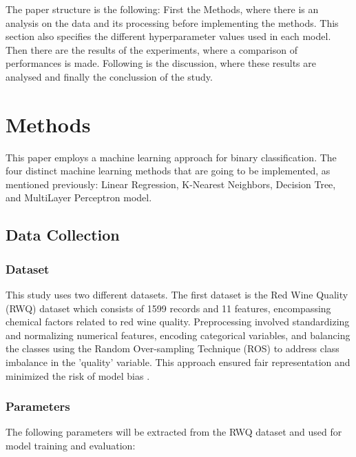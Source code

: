 \documentclass[conference]{IEEEtran}
\begin{document}
The paper structure is the following: First the Methods, where there is an analysis on the data and its processing before implementing the methods. This section also specifies the different hyperparameter values used in each model. Then there are the results of the experiments, where a comparison of performances is made. Following is the discussion, where these results are analysed and finally the conclussion of the study.

\section{Methods}
This paper employs a machine learning approach for binary classification. The four distinct machine learning methods that are going to be implemented, as mentioned previously: Linear Regression, K-Nearest Neighbors, Decision Tree, and MultiLayer Perceptron model.

\subsection{Data Collection}
\subsubsection{Dataset} 
This study uses two different datasets. The first dataset is the Red Wine Quality (RWQ) dataset which consists of 1599 records and 11 features, encompassing chemical factors related to red wine quality. Preprocessing involved standardizing and normalizing numerical features, encoding categorical variables, and balancing the classes using the Random Over-sampling Technique (ROS) to address class imbalance in the 'quality' variable. This approach ensured fair representation and minimized the risk of model bias \cite{wine_quality}.

\subsubsection{\textbf{Parameters}} The following parameters will be extracted from the RWQ dataset and used for model training and evaluation:
\end{document}
